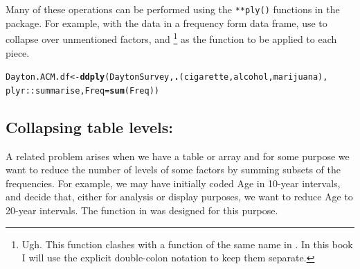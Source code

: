 \documentclass[11pt]{book}\usepackage[]{graphicx}\usepackage[]{color}
\makeatletter
\newcommand{\hlstd}[1]{\textcolor[rgb]{0.345,0.345,0.345}{#1}}%
\newcommand{\hlkwb}[1]{\textcolor[rgb]{0.69,0.353,0.396}{#1}}%
\newcommand{\hlkwc}[1]{\textcolor[rgb]{0.333,0.667,0.333}{#1}}%
\newcommand{\hlkwd}[1]{\textcolor[rgb]{0.737,0.353,0.396}{\textbf{#1}}}%
\newenvironment{kframe}{%
 \def\at@end@of@kframe{}%
 \ifinner\ifhmode%
  \def\at@end@of@kframe{\end{minipage}}%
  \begin{minipage}{\columnwidth}%
 \fi\fi%
 \def\FrameCommand##1{\hskip\@totalleftmargin \hskip-\fboxsep
 \colorbox{shadecolor}{##1}\hskip-\fboxsep
     \hskip-\linewidth \hskip-\@totalleftmargin \hskip\columnwidth}%
 \MakeFramed {\advance\hsize-\width
   \@totalleftmargin\z@ \linewidth\hsize
   \@setminipage}}%
 {\par\unskip\endMakeFramed%
 \at@end@of@kframe}
\newenvironment{knitrout}{}{} %
\renewenvironment{knitrout}{\small\renewcommand{\baselinestretch}{.85}}{} %
\makeatother
\begin{document}
Many of these operations can be performed using the \verb|**ply()| functions
in the  package.
For example, with the data in a frequency form data frame, use 
to collapse over unmentioned factors, and %
\footnote{
Ugh. This  function clashes with a function of the same name in .
In this book I will use the explicit double-colon notation to keep them
separate.
}
as the function to be applied to each piece.
\begin{knitrout}
\color{fgcolor}\begin{kframe}
\begin{alltt}
\hlstd{Dayton.ACM.df} \hlkwb{<-} \hlkwd{ddply}\hlstd{(DaytonSurvey,} \hlkwd{.}\hlstd{(cigarette, alcohol, marijuana),}
                       \hlstd{plyr::summarise,} \hlkwc{Freq}\hlstd{=}\hlkwd{sum}\hlstd{(Freq))}
\end{alltt}
\end{kframe}
\end{knitrout}


\subsection[Collapsing table levels]{Collapsing table levels: }

A related problem arises when we have a table or array and for some purpose
we want to reduce the number of levels of some factors by summing subsets
of the frequencies.  For example, we may have initially coded Age in 10-year
intervals, and decide that, either for analysis or display purposes, we
want to reduce Age to 20-year intervals.  The  function
in  was designed for this purpose.
\end{document}
